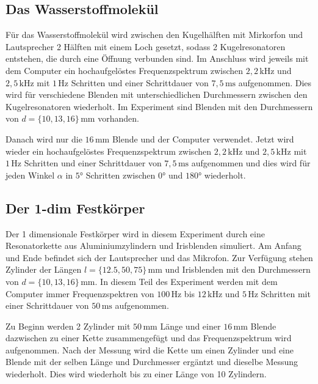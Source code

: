 \subsection{Das Wasserstoffmolekül}
\label{sec:d_H2}

Für das Wasserstoffmolekül wird zwischen den Kugelhälften mit Mirkorfon und Lautsprecher 2 Hälften mit einem Loch gesetzt, sodass 2 Kugelresonatoren entstehen, die durch eine Öffnung verbunden sind. Im Anschluss wird jeweils mit dem Computer ein hochaufgelöstes Frequenzspektrum zwischen $2, \! 2 \, \mathrm{kHz}$ und $2, \! 5 \, \mathrm{kHz}$ mit $1 \, \mathrm{Hz}$ Schritten und einer Schrittdauer von $7, \! 5 \, \mathrm{ms}$ aufgenommen. Dies wird für verschiedene Blenden mit unterschiedlichen Durchmessern zwischen den Kugelresonatoren wiederholt. Im Experiment sind Blenden mit den Durchmessern von $d = \{ 10, 13, 16 \} \, \mathrm{mm}$ vorhanden. \newline

Danach wird nur die $16 \, \mathrm{mm}$ Blende und der Computer verwendet. Jetzt wird wieder ein hochaufgelöstes Frequenzspektrum zwischen $2, \! 2 \, \mathrm{kHz}$ und $2, \! 5 \, \mathrm{kHz}$ mit $1 \, \mathrm{Hz}$ Schritten und einer Schrittdauer von $7, \! 5 \, \mathrm{ms}$ aufgenommen und dies wird für jeden Winkel $\alpha$ in $5°$ Schritten zwischen $0°$ und $180°$ wiederholt.

\subsection{Der 1-dim Festkörper}
\label{sec:d_fk}

Der 1 dimensionale Festkörper wird in diesem Experiment durch eine Resonatorkette aus Aluminiumzylindern und Irisblenden simuliert. Am Anfang und Ende befindet sich der Lautsprecher und das Mikrofon. Zur Verfügung stehen Zylinder der Längen $l = \{ 12.5, 50, 75 \} \, \mathrm{mm}$ und Irisblenden mit den Durchmessern von $d = \{ 10, 13, 16 \} \, \mathrm{mm}$. In diesem Teil des Experiment werden mit dem Computer immer Frequenzspektren von $100 \, \mathrm{Hz}$ bis $12 \, \mathrm{kHz}$ und $5 \, \mathrm{Hz}$ Schritten mit einer Schrittdauer von $50 \, \mathrm{ms}$ aufgenommen. \newline

Zu Beginn werden 2 Zylinder mit $50 \, \mathrm{mm}$ Länge und einer $16 \, \mathrm{mm}$ Blende dazwischen zu einer Kette zusammengefügt und das Frequenzspektrum wird aufgenommen. Nach der Messung wird die Kette um einen Zylinder und eine Blende mit der selben Länge und Durchmesser ergäntzt und dieselbe Messung wiederholt. Dies wird wiederholt bis zu einer Länge von 10 Zylindern. \newline

